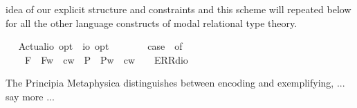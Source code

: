 \begin{isabellebody}
\begin{isamarkuptext}
  idea of our explicit structure and constraints and this scheme will repeated below
  for all the other language constructs of modal relational type theory.%
\end{isamarkuptext}%
\isamarkuptrue%
\ \isamarkupfalse%
\ Actual{\isacharcolon}{\isacharcolon}{\isachardoublequoteopen}io\ opt\ {\isasymRightarrow}\ io\ opt{\isachardoublequoteclose}\ {\isacharparenleft}{\isachardoublequoteopen}\isactrlbold {\isasymA}\ {\isacharunderscore}{\isachardoublequoteclose}\ {\isacharbrackleft}{}{}{\isacharbrackright}\ {}{}{\isacharparenright}\ \ {\isachardoublequoteopen}\isactrlbold {\isasymA}{\isasymphi}\ {\isasymequiv}\ case\ {\isasymphi}\ of\ \isanewline
\ \ \ \ F{\isacharparenleft}{\isasympsi}{\isacharparenright}\ {\isasymRightarrow}\ F{\isacharparenleft}{\isasymlambda}w{\isachardot}\ {\isasympsi}\ cw{\isacharparenright}\ {\isacharbar}\ P{\isacharparenleft}{\isasympsi}{\isacharparenright}\ {\isasymRightarrow}\ P{\isacharparenleft}{\isasymlambda}w{\isachardot}\ {\isasympsi}\ cw{\isacharparenright}\ {\isacharbar}\ {\isacharunderscore}\ {\isasymRightarrow}\ ERR{\isacharparenleft}dio{\isacharparenright}{\isachardoublequoteclose}%
\begin{isamarkuptext}%
The Principia Metaphysica distinguishes between encoding and exemplifying, ... say more ...


\end{isamarkuptext}
\end{isabellebody}
